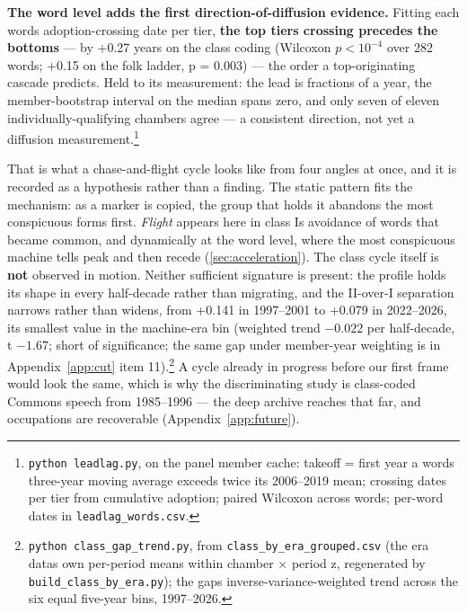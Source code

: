 \textbf{The word level adds the first direction-of-diffusion evidence.} Fitting
each word\textquotesingle s adoption-crossing date per tier, \textbf{the top tier\textquotesingle s crossing
precedes the bottom\textquotesingle s} --- by +0.27 years on the class coding (Wilcoxon \(p < 10^{-4}\) over 282 words; +0.15 on the folk ladder, p = 0.003) --- the order a
top-originating cascade predicts. Held to its measurement: the lead is
fractions of a year, the member-bootstrap interval on the median spans zero,
and only seven of eleven individually-qualifying chambers agree --- a consistent
direction, not yet a diffusion measurement.\footnote{\texttt{python\ leadlag.py}, on the panel member cache: takeoff =
  first year a word\textquotesingle s three-year moving average exceeds twice its
  2006--2019 mean; crossing dates per tier from cumulative adoption;
  paired Wilcoxon across words; per-word dates in \texttt{leadlag\_words.csv}.}

That is what a chase-and-flight cycle looks like from four angles at once, and
it is recorded as a hypothesis rather than a finding. The static pattern fits
the mechanism: as a marker is copied, the group that holds it abandons the
most conspicuous forms first. \emph{Flight} appears here in class I\textquotesingle s avoidance of
words that became common, and dynamically at the word level, where the most
conspicuous machine tells peak and then recede (\cref{sec:acceleration}). The class cycle itself
is \textbf{not} observed in motion. Neither sufficient signature is present: the
profile holds its shape in every half-decade rather than migrating, and the
II-over-I separation narrows rather than widens, from +0.141 in 1997--2001 to
+0.079 in 2022--2026, its smallest value in the machine-era bin (weighted trend
\(-0.022\) per half-decade, t \(-1.67\); short of significance; the same gap under
member-year weighting is in Appendix~\ref{app:cut} item 11).\footnote{\texttt{python\ class\_\allowbreak{}gap\_\allowbreak{}trend.\allowbreak{}py}, from \texttt{class\_\allowbreak{}by\_\allowbreak{}era\_\allowbreak{}grouped.\allowbreak{}csv} (the
  era data\textquotesingle s own per-period means within chamber \(\times\) period z, regenerated by
  \texttt{build\_class\_by\_era.py}); the gap\textquotesingle s inverse-variance-weighted trend
  across the six equal five-year bins, 1997--2026.} A cycle
already in progress before our first frame would look the same, which is why
the discriminating study is class-coded Commons speech from 1985--1996 --- the
deep archive reaches that far, and occupations are recoverable (Appendix~\ref{app:future}).

